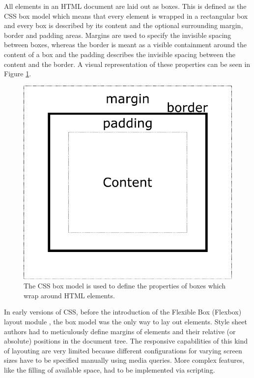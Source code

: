 All elements in an HTML document are laid out as boxes. 
This is defined as the CSS box model which means that every element is wrapped in a rectangular box and every box is described by its content and the optional surrounding margin, border and padding areas.
Margins are used to specify the invisible spacing between boxes, whereas the border is meant as a visible containment around the content of a box and the padding describes the invisible spacing between the content and the border. 
A visual representation of these properties can be seen in Figure \ref{fig:BoxModel}.

\begin{figure}[tp]
\centering
\includegraphics[keepaspectratio,width=\linewidth,height=\fullh / 4]{diagrams/box-model.pdf}
\caption[CSS Box Model]{
  The CSS box model is used to define the properties of boxes which wrap around HTML elements.
}
\label{fig:BoxModel}
\end{figure}

In early versions of CSS, before the introduction of the Flexible Box (Flexbox) layout module \parencite{CSSFlexboxFirstDraft}, the box model was the only way to lay out elements. 
Style sheet authors had to meticulously define margins of elements and their relative (or absolute) positions in the document tree. 
The responsive capabilities of this kind of layouting are very limited because different configurations for varying screen sizes have to be specified manually using media queries.
More complex features, like the filling of available space, had to be implemented via scripting.

